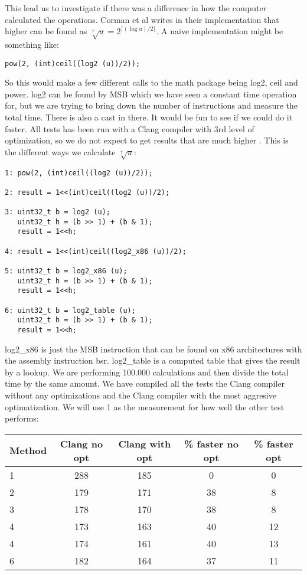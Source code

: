 \documentclass[oneside,11pt,openright]{report}
\newcommand{\HIGHER}{\sqrt[\uparrow]{u}}
\begin{document}
This lead us to investigate if there was a difference in how the computer calculated the operations. Corman et al writes in their implementation that higher can be found as $\HIGHER = 2^{\lceil{(\log u)/2}\rceil}$. A naive implementation might be something like:
\begin{lstlisting}
pow(2, (int)ceil((log2 (u))/2));
\end{lstlisting}

So this would make a few different calls to the math package being log2, ceil and power. log2 can be found by MSB which we have seen a constant time operation for, but we are trying to bring down the number of instructions and measure the total time. There is also a cast in there. It would be fun to see if we could do it faster. All tests has been run with a Clang compiler with 3rd level of optimization, so we do not expect to get results that are much higher . This is the different ways we calculate $\HIGHER$:

\begin{lstlisting}
1: pow(2, (int)ceil((log2 (u))/2));

2: result = 1<<(int)ceil((log2 (u))/2);

3: uint32_t b = log2 (u);
   uint32_t h = (b >> 1) + (b & 1);
   result = 1<<h;

4: result = 1<<(int)ceil((log2_x86 (u))/2);

5: uint32_t b = log2_x86 (u);
   uint32_t h = (b >> 1) + (b & 1);
   result = 1<<h;

6: uint32_t b = log2_table (u);
   uint32_t h = (b >> 1) + (b & 1);
   result = 1<<h;

\end{lstlisting}

log2\_x86 is just the MSB instruction that can be found on x86 architectures with the assembly instruction bsr. log2\_table is a computed table that gives the result by a lookup. We are performing 100.000 calculations and then divide the total time by the same amount. We have compiled all the tests the Clang compiler without any optimizations and the Clang compiler with the most aggresive optimatization. We will use 1 as the measurement for how well the other test performs:

\begin{center}
  \begin{tabular}{ l | c | c | c | c }
    Method & Clang no opt & Clang with opt & \% faster no opt & \% faster opt  \\ \hline
    1 & 288 & 185 & 0 & 0 \\ 
    2 & 179 & 171 & 38 & 8\\ 
    3 & 178 & 170 & 38 & 8 \\ 
    4 & 173 & 163 & 40 & 12\\ 
    4 & 174 & 161 & 40 & 13 \\ 
    6 & 182 & 164 & 37 & 11 \\ 
  \end{tabular}
\end{center}
\end{document}
